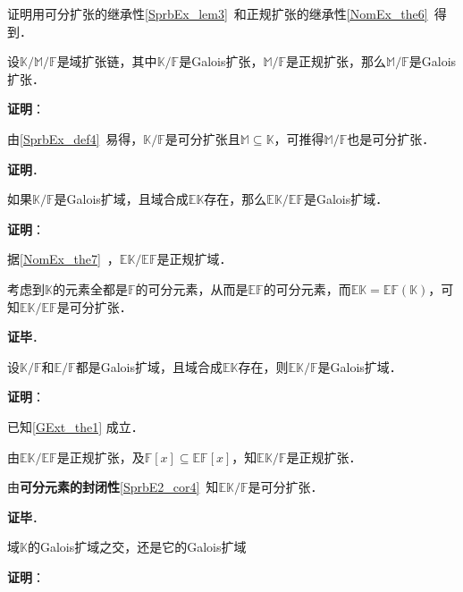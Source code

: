 证明用可分扩张的继承性\autoref{SprbEx_lem3}~和正规扩张的继承性\autoref{NomEx_the6}~得到．

\begin{theorem}{}
设$\mathbb{K}/\mathbb{M}/\mathbb{F}$是域扩张链，其中$\mathbb{K}/\mathbb{F}$是Galois扩张，$\mathbb{M}/\mathbb{F}$是正规扩张，那么$\mathbb{M}/\mathbb{F}$是Galois扩张．
\end{theorem}

\textbf{证明}：

由\autoref{SprbEx_def4}~易得，$\mathbb{K}/\mathbb{F}$是可分扩张且$\mathbb{M}\subseteq\mathbb{K}$，可推得$\mathbb{M}/\mathbb{F}$也是可分扩张．

\textbf{证明}．

\begin{theorem}{}\label{GExt_the1}
如果$\mathbb{K}/\mathbb{F}$是Galois扩域，且域合成$\mathbb{EK}$存在，那么$\mathbb{EK}/\mathbb{EF}$是Galois扩域．
\end{theorem}

\textbf{证明}：

据\autoref{NomEx_the7}~，$\mathbb{EK}/\mathbb{EF}$是正规扩域．

考虑到$\mathbb{K}$的元素全都是$\mathbb{F}$的可分元素，从而是$\mathbb{EF}$的可分元素，而$\mathbb{EK}=\mathbb{EF}(\mathbb{K})$，可知$\mathbb{EK}/\mathbb{EF}$是可分扩张．

\textbf{证毕}．



\begin{theorem}{}
设$\mathbb{K}/\mathbb{F}$和$\mathbb{E}/\mathbb{F}$都是Galois扩域，且域合成$\mathbb{EK}$存在，则$\mathbb{EK}/\mathbb{F}$是Galois扩域．
\end{theorem}

\textbf{证明}：

已知\autoref{GExt_the1} 成立．

由$\mathbb{EK}/\mathbb{EF}$是正规扩张，及$\mathbb{F}[x]\subseteq\mathbb{EF}[x]$，知$\mathbb{EK}/\mathbb{F}$是正规扩张．

由\textbf{可分元素的封闭性}\autoref{SprbE2_cor4}~知$\mathbb{EK}/\mathbb{F}$是可分扩张．

\textbf{证毕}．




\begin{theorem}{}
域$\mathbb{K}$的Galois扩域之交，还是它的Galois扩域
\end{theorem}

\textbf{证明}：

